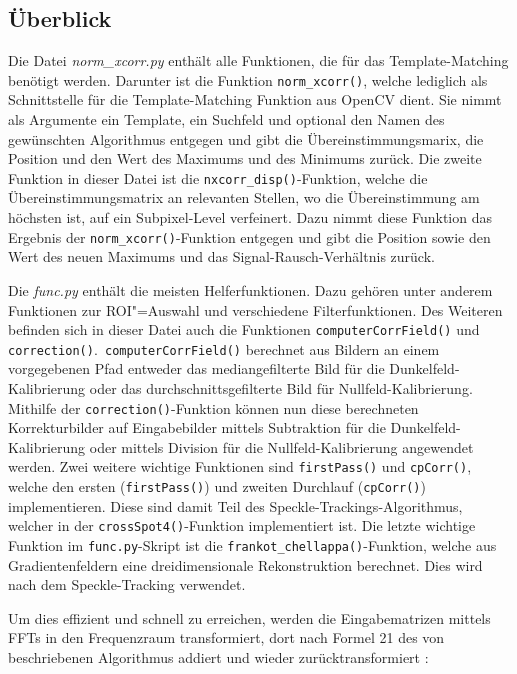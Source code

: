 \subsection{Überblick}

\begin{sloppypar}
	Die Datei \textit{norm\_xcorr.py} enthält alle Funktionen, die für das Template-Matching benötigt werden. Darunter ist die Funktion \texttt{norm\_xcorr()}, welche lediglich als Schnittstelle für die Template-Matching Funktion aus OpenCV dient. Sie nimmt als Argumente ein Template, ein Suchfeld und optional den Namen des gewünschten Algorithmus entgegen und gibt die Übereinstimmungsmarix, die Position und den Wert des Maximums und des Minimums zurück. Die zweite Funktion in dieser Datei ist die \texttt{nxcorr\_disp()}-Funktion, welche die Übereinstimmungsmatrix an relevanten Stellen, wo die Übereinstimmung am höchsten ist, auf ein Subpixel-Level verfeinert. Dazu nimmt diese Funktion das Ergebnis der \texttt{norm\_xcorr()}-Funktion entgegen und gibt die Position sowie den Wert des neuen Maximums und das Signal-Rausch-Verhältnis zurück. \cite{Coj17}
\end{sloppypar}

Die \textit{func.py} enthält die meisten Helferfunktionen. Dazu gehören unter anderem Funktionen zur \gls{ROI}"=Auswahl und verschiedene Filterfunktionen. Des Weiteren befinden sich in dieser Datei auch die Funktionen \texttt{computerCorrField()} und \texttt{correction()}.\texttt{ computerCorrField()} berechnet aus Bildern an einem vorgegebenen Pfad entweder das mediangefilterte Bild für die Dunkelfeld-Kalibrierung oder das durchschnittsgefilterte Bild für Nullfeld-Kalibrierung. Mithilfe der \texttt{correction()}-Funktion können nun diese berechneten Korrekturbilder auf Eingabebilder mittels Subtraktion für die Dunkelfeld-Kalibrierung oder mittels Division für die Nullfeld-Kalibrierung angewendet werden. Zwei weitere wichtige Funktionen sind \texttt{firstPass()} und \texttt{cpCorr()}, welche den ersten (\texttt{firstPass()}) und zweiten Durchlauf (\texttt{cpCorr()}) implementieren. Diese sind damit Teil des Speckle-Trackings-Algorithmus, welcher in der \texttt{crossSpot4()}-Funktion implementiert ist. Die letzte wichtige Funktion im \texttt{func.py}-Skript ist die \texttt{frankot\_chellappa()}-Funktion, welche aus Gradientenfeldern eine dreidimensionale Rekonstruktion berechnet. Dies wird nach dem Speckle-Tracking verwendet. \cite{Coj17}

Um dies effizient und schnell zu erreichen, werden die Eingabematrizen mittels \glspl{FFT} in den Frequenzraum transformiert, dort nach Formel 21 des von \citeauthor{FC88} beschriebenen Algorithmus addiert und wieder zurücktransformiert :

